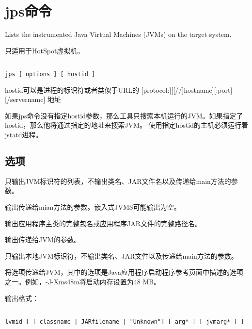\section{jps命令}
\label{chap:tools_jps}

Lists the instrumented Java Virtual Machines (JVMs) on the target system. 

只适用于HotSpot虚拟机。

\begin{lstlisting}[language=cshell]

jps [ options ] [ hostid ]

\end{lstlisting}

hostid可以是进程的标识符或者类似于URL的 [protocol:][[//]hostname][:port][/servername] 地址

如果jps命令没有指定hostid参数，那么工具只搜索本机运行的JVM。如果指定了hostid，那么他将通过指定的地址来搜索JVM。
使用指定hostid的主机必须运行着jstatd进程。

\subsection{选项} 


只输出JVM标识符的列表，不输出类名、JAR文件名以及传递给main方法的参数。



输出传递给mian方法的参数。嵌入式JVMS可能输出为空。



输出应用程序主类的完整包名或应用程序JAR文件的完整路径名。


输出传递给JVM的参数。


只输出本地JVM标识符，不输出类名、JAR文件以及传递给main方法的参数。



将选项传递给JVM，其中的选项是Java应用程序启动程序参考页面中描述的选项之一。例如，-J-Xms48m将启动内存设置为48 MB。



输出格式：

\begin{lstlisting}[language=cshell]

lvmid [ [ classname | JARfilename | "Unknown"] [ arg* ] [ jvmarg* ] ]

\end{lstlisting}



